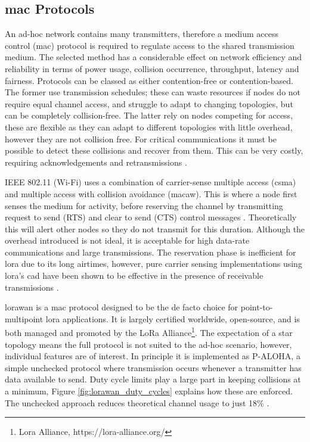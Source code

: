 \subsection{\ac{mac} Protocols}
\label{sec:mac_protocol_background}
An ad-hoc network contains many transmitters, therefore a medium access control (\ac{mac}) protocol is required to regulate access to the shared transmission medium. The selected method has a considerable effect on network efficiency and reliability in terms of power usage, collision occurrence, throughput, latency and fairness. Protocols can be classed as either contention-free or contention-based. The former use transmission schedules; these can waste resources if nodes do not require equal channel access, and struggle to adapt to changing topologies, but can be completely collision-free. The latter rely on nodes competing for access, these are flexible as they can adapt to different topologies with little overhead, however they are not collision free. For critical communications it must be possible to detect these collisions and recover from them. This can be very costly, requiring acknowledgements and retransmissions \cite{3YP:WSN_BOOK}.

IEEE 802.11 (Wi-Fi) uses a combination of carrier-sense multiple access (\ac{csma}) and multiple access with collision avoidance (\ac{macaw}). This is where a node first senses the medium for activity, before reserving the channel by transmitting request to send (RTS) and clear to send (CTS) control messages \cite{3YP:NETWORK_BOOK}. Theoretically this will alert other nodes so they do not transmit for this duration. Although the overhead introduced is not ideal, it is acceptable for high data-rate communications and large transmissions. The reservation phase is inefficient for \ac{lora} due to its long airtimes, however, pure carrier sensing implementations using \ac{lora}'s \ac{cad} have been shown to be effective in the presence of receivable transmissions \cite{3YP:LORA_CSMA}. 

\ac{lorawan} is a \ac{mac} protocol designed to be the de facto choice for point-to-multipoint \ac{lora} applications. It is largely certified worldwide, open-source, and is both managed and promoted by the LoRa Alliance\footnote{Lora Alliance,  https://lora-alliance.org/}. The expectation of a star topology means the full protocol is not suited to the ad-hoc scenario, however, individual features are of interest. In principle it is implemented as P-ALOHA, a simple unchecked protocol where transmission occurs whenever a transmitter has data available to send. Duty cycle limits play a large part in keeping collisions at a minimum, Figure \ref{fig:lorawan_duty_cycles} explains how these are enforced. The unchecked approach reduces theoretical channel usage to just 18\% \cite{3YP:LORAWAN_SLOTTED}.

